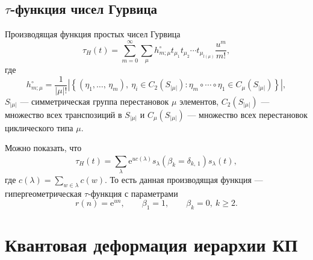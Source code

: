 \documentclass[a4paper,14pt]{extarticle}
\numberwithin{equation}{section}
\begin{document}
\subsection{$\tau$-функция чисел Гурвица}
Производящая функция простых чисел Гурвица
\begin{equation}
	\tau_H(t)=
	\sum_{m=0}^{\infty} \sum_{\mu}^{} h_{m;\mu}^{\circ}
	t_{\mu_1} t_{\mu_2} \cdots t_{\mu_{l(\mu)}}
	\frac{u^m}{m!}
,\end{equation} 
где
\begin{equation}
h^{\circ}_{m;\mu}= \frac{1}{|\mu|!}
\left| \left\{ \left( \eta_1,\ldots,\,\eta_m \right) ,\ 
\eta_i \in C_2 \left( S_{|\mu|} \right) \colon
\eta_m \circ \cdots \circ \eta_1 \in C_\mu\left( S_{|\mu|} \right) \right\}  \right| 
,\end{equation} 
$S_{|\mu|}$ --- симметрическая группа перестановок $\mu$ 
элементов, $C_2\left( S_{|\mu|} \right) $ --- множество
всех транспозиций в $S_{|\mu|}$ и $C_\mu \left( S_{|\mu|} \right) $ --- множество всех перестановок циклического типа $\mu$.

Можно показать, что
\begin{equation}
	\tau_H(t)=\sum_{\lambda}^{} \mathrm{e}^{u c(\lambda)}s_\lambda \left( \beta_k=\delta_{k,\,1} \right) 
	s_\lambda(t)
\label{eq:4}
,\end{equation} 
где $c(\lambda)= \sum_{w \in \lambda}^{} c(w)$. 
То есть данная производящая функция --- гипергеометрическая
$\tau$-функция с параметрами
\begin{equation}
	r(n)=\mathrm{e} ^{un},\qquad
	\beta_1=1,\qquad \beta_k=0,\ k\ge 2
.\end{equation} 
\section{Квантовая деформация иерархии КП}


\end{document}
